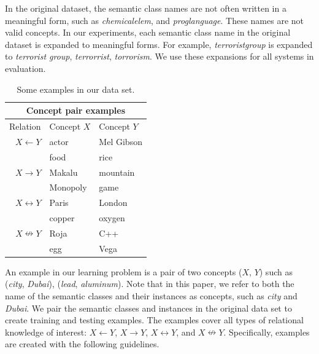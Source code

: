 In the original dataset, the semantic class names are not often
written in a meaningful form, such as {\em chemicalelem}, and {\em
  proglanguage}. These names are not valid
concepts. In our experiments, each semantic class name in the original
dataset is expanded to meaningful forms. For example, {\em
  terroristgroup} is expanded to {{\em terrorist group}, {\em
    terrorrist}, {\em torrorism}}. We use these expansions for all
systems in evaluation.

\begin{table}[!t]
  \small
  \centering
  \begin{tabular}{|r|l|l|}
    \hline
    \multicolumn{3}{|c|}{Concept pair examples} \\
    \hline
    Relation          & Concept $X$ & Concept $Y$    \\
    \hline
    \hline
    $X \leftarrow Y$        & actor             & Mel Gibson           \\
    & food              & rice                 \\
    \hline                               
    $X \rightarrow Y$       & Makalu            & mountain             \\
    & Monopoly          & game                 \\
    \hline                               
    $X \leftrightarrow Y$   & Paris             & London               \\
    & copper            & oxygen                \\
    \hline                               
    $X \nleftrightarrow Y$ & Roja              & C++                  \\
    & egg               & Vega                  \\
    \hline
  \end{tabular}
  \caption{Some examples in our data set.}
  \label{table:examples}
\end{table}


An example in our learning problem is a pair of two concepts ($X$,
$Y$) such as ({\em city}, {\em Dubai}), ({\em lead}, {\em
  aluminum}). Note that in this paper, we refer to both the name of
the semantic classes and their instances as concepts, such as {\em
  city} and {\em Dubai}. We pair the semantic classes and instances in
the original data set to create training and testing examples. The
examples cover all types of relational knowledge of interest: $X
\leftarrow Y$, $X \rightarrow Y$, $X \leftrightarrow Y$, and $X
\nleftrightarrow Y$. Specifically, examples are created with the
following guidelines.

